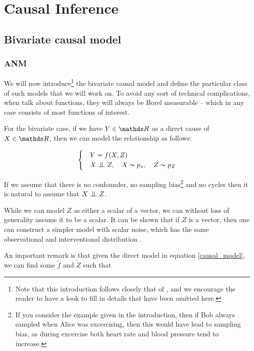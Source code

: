 \chapter{Causal Inference}

\section{Bivariate causal model}

\subsection{ANM}

We will now introduce\footnote{Note that this introduction follows closely that of \cite{Mooij2016jmlr}, and 
we encourage the reader to have a look to fill in details that have been omitted here.} 
the bivariate causal model and define the particular class of such models that 
we will work on. To avoid any sort of technical complications, when talk about functions, 
they will always be Borel measurable -- which in any case consists of most functions of interest.

For the bivariate case, if we have $Y \in \R$ as a direct cause of $X \in \R$, then we can model 
the relationship as follows:

\begin{equation}
    \begin{cases} 
        & Y = f(X, Z) \\
        & X \bigCI Z,\quad X \thicksim p_x,\quad Z \thicksim p_{Z}  
     \end{cases}
     \label{causal_model}
\end{equation}

If we assume that there is no confounder, no sampling bias\footnote{If you consider the 
example given in the introduction, then if Bob always sampled when Alice was excercising, then this 
would have lead to sampling bias, as during excercise both heart rate and blood pressure tend to increase.} 
and no cycles then it is natural to assume that $X \bigCI Z$.

While we can model $Z$ as either a scalar of a vector, we can without loss of generality assume it to be a scalar.
It can be shown that if $Z$ is a vector, then one can construct a simpler model with scalar noise, which has the 
same observational and interventional distribution \cite{Mooij2016jmlr}.

An important remark is that given the direct model in equation \ref{causal_model}, we can find some 
$\tilde{f}$ and $\tilde{Z}$ such that

